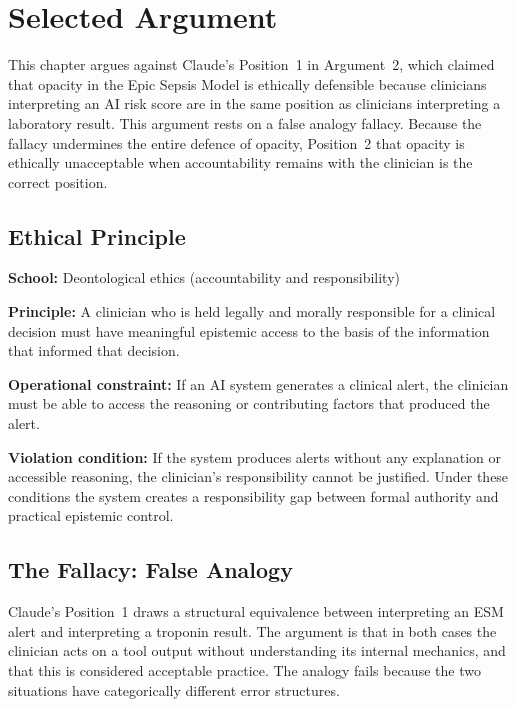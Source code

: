 \documentclass[]{UCD_CS_41820_Report}
\begin{document}
\section*{Selected Argument}

This chapter argues against Claude's Position~1 in Argument~2, which claimed that
opacity in the Epic Sepsis Model is ethically defensible because clinicians
interpreting an AI risk score are in the same position as clinicians interpreting
a laboratory result. This argument rests on a false analogy fallacy. Because the
fallacy undermines the entire defence of opacity, Position~2 that opacity is
ethically unacceptable when accountability remains with the clinician is the correct
position.

\subsection*{Ethical Principle}

\textbf{School:} Deontological ethics (accountability and responsibility)

\textbf{Principle:}
A clinician who is held legally and morally responsible for a clinical decision must
have meaningful epistemic access to the basis of the information that informed that
decision.

\textbf{Operational constraint:}
If an AI system generates a clinical alert, the clinician must be able to access
the reasoning or contributing factors that produced the alert.

\textbf{Violation condition:}
If the system produces alerts without any explanation or accessible reasoning, the
clinician's responsibility cannot be justified. Under these conditions the system
creates a responsibility gap between formal authority and practical epistemic
control.

\subsection*{The Fallacy: False Analogy}

Claude's Position~1 draws a structural equivalence between interpreting an ESM
alert and interpreting a troponin result. The argument is that in both cases the
clinician acts on a tool output without understanding its internal mechanics, and
that this is considered acceptable practice. The analogy fails because the two
situations have categorically different error structures.
\end{document}
